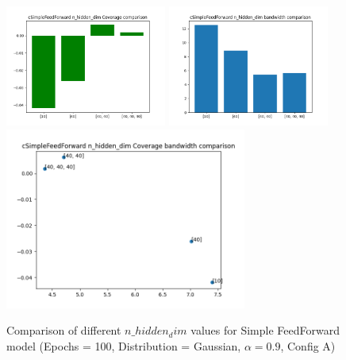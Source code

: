 \documentclass[a4paper, 12pt]{article}
\begin{document}
\begin{figure}[!h]
    \centering
    \includegraphics[width=200px]{plots/hist/a/cSimpleFeedForward/n_hidden_dim/Coverage.png}
    \includegraphics[width=200px]{plots/hist/a/cSimpleFeedForward/n_hidden_dim/bandwidth.png}
    \includegraphics[width=300px]{plots/scatter/a/cSimpleFeedForward/n_hidden_dim/Coverage_bandwidth.png}
    \caption{Comparison of different $n\_hidden_dim$ values for Simple FeedForward model (Epochs = 100, Distribution = Gaussian, $\alpha = 0.9$, Config A)}
    \label{fig:comp_feedfordward}
\end{figure}
\end{document}
